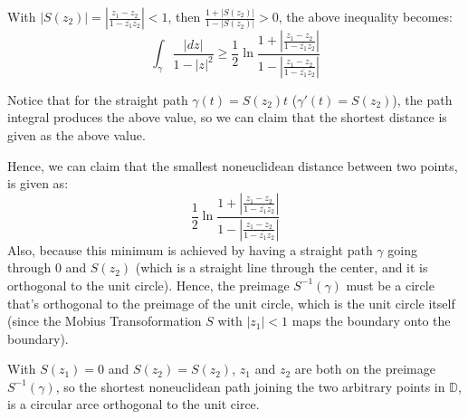 \documentclass{article}
\begin{document}
With $|S(z_2)| = \left|\frac{z_1-z_2}{1-\bar{z_1}z_2}\right| <1$, then $\frac{1+|S(z_2)|}{1-|S(z_2)|}>0$, the above inequality becomes:
$$\int_{\gamma}\frac{|dz|}{1-|z|^2}\geq \frac{1}{2}\ln\frac{1+\left|\frac{z_1-z_2}{1-\bar{z_1}z_2}\right|}{1-\left|\frac{z_1-z_2}{1-\bar{z_1}z_2}\right|}$$

Notice that for the straight path $\gamma(t)=S(z_2)t$ ($\gamma'(t)=S(z_2)$), the path integral produces the above value,
so we can claim that the shortest distance is given as the above value.

\hfill

Hence, we can claim that the smallest noneuclidean distance between two points, is given as:
$$\frac{1}{2}\ln\frac{1+\left|\frac{z_1-z_2}{1-\bar{z_1}z_2}\right|}{1-\left|\frac{z_1-z_2}{1-\bar{z_1}z_2}\right|}$$
Also, because this minimum is achieved by having a straight path $\gamma$ going through $0$ and $S(z_2)$ (which is a straight line through the center, and it is orthogonal to the unit circle).
Hence, the preimage $S^{-1}(\gamma)$ must be a circle that's orthogonal to the preimage of the unit circle, which is the unit circle itself (since the Mobius Transoformation $S$ with $|z_1|<1$ maps the boundary onto the boundary).

With $S(z_1)=0$ and $S(z_2)=S(z_2)$, $z_1$ and $z_2$ are both on the preimage $S^{-1}(\gamma)$, so the shortest noneuclidean path joining the two arbitrary points in $\mathbb{D}$,
is a circular arce orthogonal to the unit circe.
\end{document}
